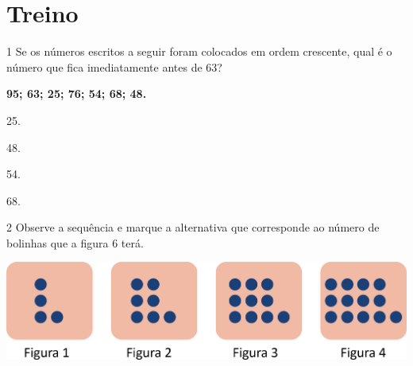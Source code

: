 \pagebreak

\section*{Treino}

\num{1} Se os números escritos a seguir foram colocados em ordem crescente, qual
é o número que fica imediatamente antes de 63?

\begin{myquote}
\centering
\textbf{95; 63; 25; 76; 54; 68; 48.}
\end{myquote}

\begin{escolha}
\begin{multicols}{2}
\item 25.

\item 48.
\end{multicols}


\begin{multicols}{2}
\item 54.

\item 68.
\end{multicols}
\end{escolha}

\num{2} Observe a sequência e marque a alternativa que corresponde ao número de bolinhas que a figura 6 terá.

\vspace{1em}


\begin{center}
\includegraphics[width=.7\textwidth]{./media/image32.png}
\end{center}

